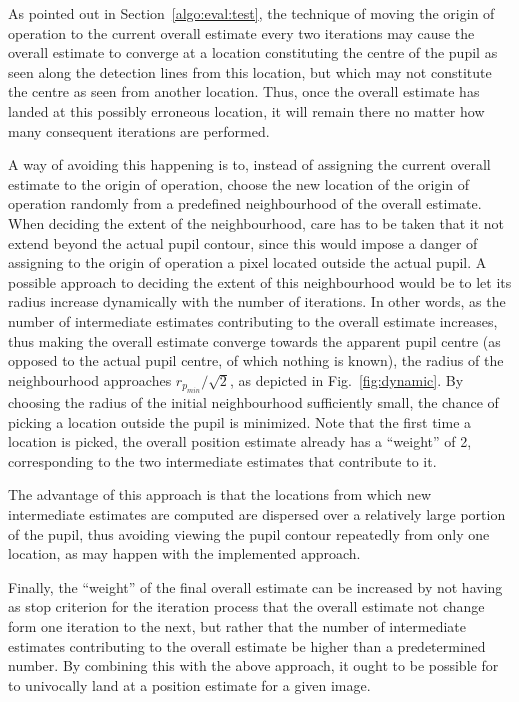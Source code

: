 As pointed out in Section~\ref{algo:eval:test}, the technique of
moving the origin of operation to the current overall estimate every
two iterations may cause the overall estimate to converge at a
location constituting the centre of the pupil as seen along the
detection lines from this location, but which may not constitute the
centre as seen from another location.  Thus, once the overall
estimate has landed at this possibly erroneous location, it will
remain there no matter how many consequent iterations are performed.

A way of avoiding this happening is to, instead of assigning the
current overall estimate to the origin of operation, choose the new
location of the origin of operation randomly from a predefined
neighbourhood of the overall estimate.  When deciding the extent of
the neighbourhood, care has to be taken that it not extend beyond the
actual pupil contour, since this would impose a danger of assigning to
the origin of operation a pixel located outside the actual pupil.  A
possible approach to deciding the extent of this neighbourhood would
be to let its radius increase dynamically with the number of
iterations.  In other words, as the number of intermediate estimates
contributing to the overall estimate increases, thus making the
overall estimate converge towards the apparent pupil centre (as
opposed to the actual pupil centre, of which nothing is known), the
radius of the neighbourhood approaches $r_{p_{min}}/\sqrt{2}$, as
depicted in Fig.~\ref{fig:dynamic}.  By choosing the radius of the
initial neighbourhood sufficiently small, the chance of picking a
location outside the pupil is minimized.  Note that the first time a
location is picked, the overall position estimate already has a
``weight'' of 2, corresponding to the two intermediate estimates that
contribute to it.

The advantage of this approach is that the locations from which new
intermediate estimates are computed are dispersed over a relatively
large portion of the pupil, thus avoiding viewing the pupil contour
repeatedly from only one location, as may happen with the implemented
approach.

Finally, the ``weight'' of the final overall estimate can be increased
by not having as stop criterion for the iteration process that the
overall estimate not change form one iteration to the next, but rather
that the number of intermediate estimates contributing to the overall
estimate be higher than a predetermined number.  By combining this
with the above approach, it ought to be possible for {\octopus} to
univocally land at a position estimate for a given image.

